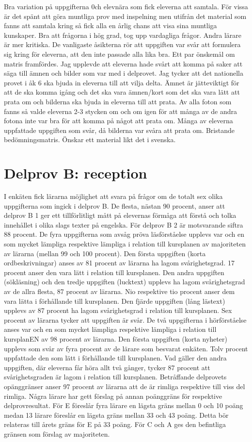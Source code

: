 Bra variation på uppgifterna 0ch elevnära som fick eleverna att samtala.
För vissa är det spänt att göra muntliga prov med inspelning men utifrån det material som fanns att samtala kring så fick alla en årlig chans att visa sina muntliga kunskaper.
Bra att frågorna i hög grad, tog upp vardagliga frågor.
Andra lärare är mer kritiska. De vanligaste åsikterna rör att uppgiften var svår att formulera sig kring för eleverna, att den inte passade alla lika bra. Ett par önskemål om matris framfördes.
Jag upplevde att eleverna hade svårt att komma på saker att säga till ämnen och bilder som var med i delprovet. Jag tycker att det nationella provet i åk 6 ska bjuda in eleverna till att vilja delta. Ämnet är jätteviktigt för att de ska komma igång och det ska vara ämnen/kort som det ska vara lätt att prata om och bilderna ska bjuda in eleverna till att prata. Av alla foton som fanns så valde eleverna 2-3 stycken om och om igen för att många av de andra fotona inte var bra för att komma på något att prata om.
Många av eleverna uppfattade uppgiften som svår, då bilderna var svåra att prata om.
Bristande bedömningsmatris. Önskar ett material likt det i svenska.
\section*{Delprov B: reception}
I enkäten fick lärarna möjlighet att svara på frågor om de totalt sex olika uppgifterna som ingick i delprov B. De flesta, nästan 90 procent, anser att delprov B 1 ger ett tillförlitligt mått på elevernas förmåga att förstå och tolka innehållet i olika slags texter på engelska. För delprov B 2 är motsvarande siftra 88 procent.
De fyra uppgifterna som avsåg pröva läsförståelse upplevs var och en som mycket lämpliga respektive lämpliga i relation till kursplanen av majoriteten av lärarna (mellan 99 och 100 procent). Den första uppgiften (korta ordbeskrivningar) anses av 81 procent av lärarna ha lagom svårighetsgrad. 17 procent anser den vara lätt i relation till kursplanen.
Den andra uppgiften (sökläsning) och den tredje uppgiften (lucktext) upplevs ha lagom svårighetsgrad av de allra flesta, 87 procent av lärarna. Nio respektive tio procent anser dem vara lätta i förhållande till kursplanen. Den fjärde uppgiften (lång lästext) upplevs av 87 procent ha lagom svårighetsgrad i relation till kursplanen. Sex procent av lärarna tycker att uppgiften är svår.
De två uppgifterna i hörförståelse anses var och en som mycket lämpliga respektive lämpliga i relation till kursplanEN av 98 procent av lärarna. Den första uppgiften (korta nyheter) upplevs som svår av fyra procent av de lärare som besvarat enkäten. Tolv procent uppfattade den som lätt i förhållande till kursplanen. Vad gäller den andra uppgiften, där eleverna får höra allt två gånger, tycker 87 procent att svårighetsgraden är lagom i relation till kursplanen.
Betråffande delprovets opänggränser anser 97 procent av lärarna att de är rimliga respektive till viss del rimliga. Några lärare har gett förslag på annan poänggräns för respektive delprovresultat. För E föreslår fyra lärare en lägsta gräns mellan 0 och 10 poäng medan 13 lärare föreslår en lägsta gräns mellan 33 och 43 poäng. Detta bör relateras till årets gräns för E på 33 poäng. För C och A ges den befintliga gränsen som förslag av majoriteten.

